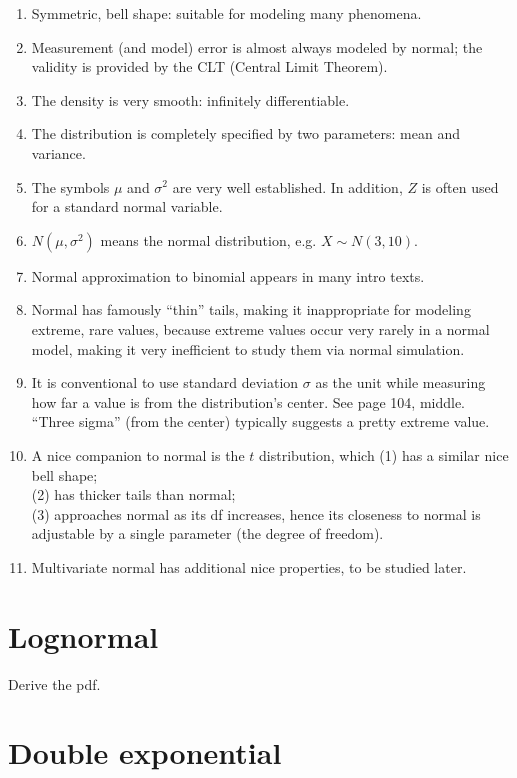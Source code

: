 \documentclass[12pt]{article}
\begin{document}
\begin{enumerate}
\item Symmetric, bell shape: suitable for modeling many phenomena.
\item Measurement (and model) error is almost always modeled by normal;
the validity is provided by the CLT (Central Limit Theorem).
\item The density is very smooth: infinitely differentiable.
\item The distribution is completely specified by two parameters: mean
and variance.
\item The symbols $\mu$ and $\sigma^2$ are very well established.
In addition, $Z$ is often used for a standard normal variable.
\item $N(\mu, \sigma^2)$ means the normal distribution, e.g.\@
    $X \sim N(3, 10)$.
\item Normal approximation to binomial appears in many intro texts.
\item Normal has famously ``thin'' tails, making it inappropriate for
modeling extreme, rare values, because extreme values occur very rarely
in a normal model, making it very inefficient to study them via normal
simulation.
\item It is conventional to use standard deviation $\sigma$ as the unit
    while measuring how far a value is from the distribution's center.
    See page 104, middle. ``Three sigma'' (from the center)
    typically suggests a pretty extreme value.
\item A nice companion to normal is the $t$ distribution, which
(1) has a similar nice bell shape;\\
(2) has thicker tails than normal;\\
(3) approaches normal as its df increases, hence its closeness to normal
is adjustable by a single parameter (the degree of freedom).
\item Multivariate normal has additional nice properties, to be studied
later.
\end{enumerate}


\section{Lognormal}

\exercise%
Derive the pdf.

\section{Double exponential}
\end{document}
